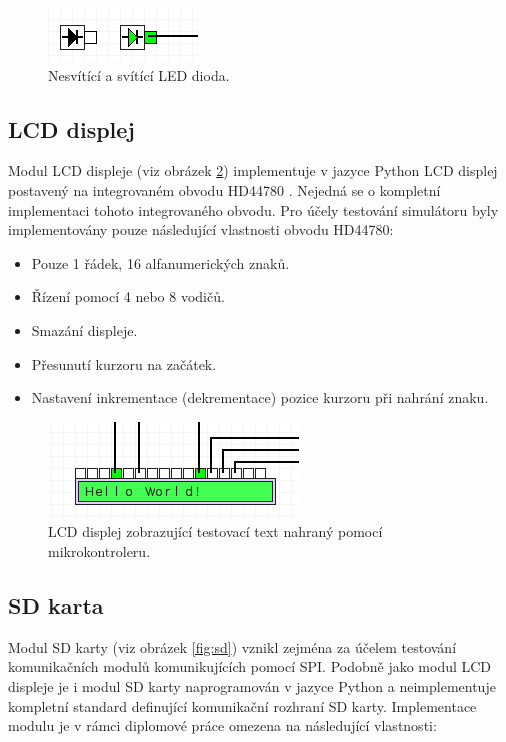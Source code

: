 \begin{figure}[ht]
\centering
\includegraphics[trim=0cm 0cm 0cm 0cm, scale=1]{fig/led}
\caption{Nesvítící a svítící LED dioda.}
\label{fig:dioda}
\end{figure}

\subsection{LCD displej}

Modul LCD displeje (viz obrázek \ref{fig:lcd}) implementuje v jazyce Python LCD displej postavený na integrovaném obvodu HD44780 \cite{hd44780}. Nejedná se o kompletní implementaci tohoto integrovaného obvodu. Pro účely testování simulátoru byly implementovány pouze následující vlastnosti obvodu HD44780:

\begin{itemize}
\item Pouze 1 řádek, 16 alfanumerických znaků.
\item Řízení pomocí 4 nebo 8 vodičů.
\item Smazání displeje.
\item Přesunutí kurzoru na začátek.
\item Nastavení inkrementace (dekrementace) pozice kurzoru při nahrání znaku.
\end{itemize}

\begin{figure}[ht]
\centering
\includegraphics[trim=0cm 0cm 0cm 0cm, scale=1]{fig/lcd}
\caption{LCD displej zobrazující testovací text nahraný pomocí mikrokontroleru.}
\label{fig:lcd}
\end{figure}

\subsection{SD karta}

Modul SD karty (viz obrázek \ref{fig:sd}) vznikl zejména za účelem testování komunikačních modulů komunikujících pomocí SPI. Podobně jako modul LCD displeje je i modul SD karty naprogramován v jazyce Python a neimplementuje kompletní standard \cite{sdio} definující komunikační rozhraní SD karty. Implementace modulu je v rámci diplomové práce omezena na následující vlastnosti:

